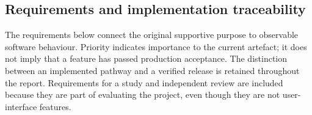 \subsection{Requirements and implementation traceability}

The requirements below connect the original supportive purpose to observable software behaviour. Priority indicates importance to the current artefact; it does not imply that a feature has passed production acceptance. The distinction between an implemented pathway and a verified release is retained throughout the report. Requirements for a study and independent review are included because they are part of evaluating the project, even though they are not user-interface features.

\begingroup
\small{}
\setlength{\tabcolsep}{4pt}
\setlength{\TableInnerWidth}{\dimexpr\linewidth-24pt\relax}
